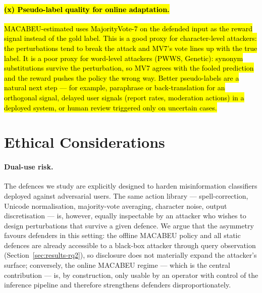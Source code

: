 \documentclass[11pt]{article}
\begin{document}
\paragraph{\hl{(x) Pseudo-label quality for online adaptation.}} \hl{MACABEU-estimated uses MajorityVote-7 on the defended input as the reward signal instead of the gold label. This is a good proxy for character-level attackers: the perturbations tend to break the attack and MV7's vote lines up with the true label. It is a poor proxy for word-level attackers (PWWS, Genetic): synonym substitutions survive the perturbation, so MV7 agrees with the fooled prediction and the reward pushes the policy the wrong way. Better pseudo-labels are a natural next step --- for example, paraphrase or back-translation for an orthogonal signal, delayed user signals (report rates, moderation actions) in a deployed system, or human review triggered only on uncertain cases.}

\section*{Ethical Considerations}

\paragraph{Dual-use risk.} The defences we study are explicitly designed to harden misinformation classifiers deployed against adversarial users. The same action library --- spell-correction, Unicode normalisation, majority-vote averaging, character noise, output discretisation --- is, however, equally inspectable by an attacker who wishes to design perturbations that survive a given defence. We argue that the asymmetry favours defenders in this setting: the offline MACABEU policy and all static defences are already accessible to a black-box attacker through query observation (Section~\ref{sec:results-rq2}), so disclosure does not materially expand the attacker's surface; conversely, the online MACABEU regime --- which is the central contribution --- is, by construction, only usable by an operator with control of the inference pipeline and therefore strengthens defenders disproportionately.

\end{document}
